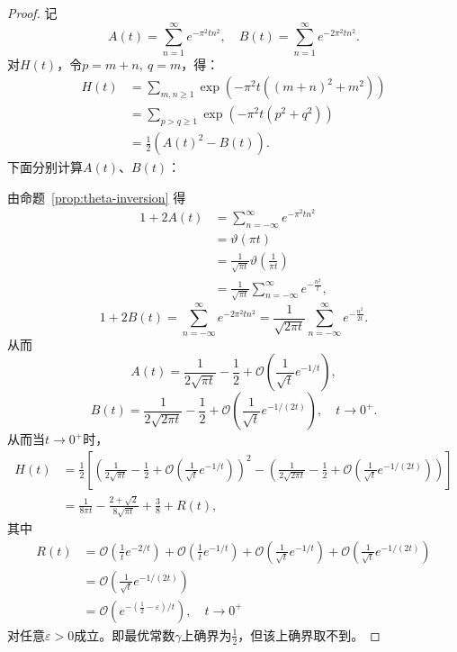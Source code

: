 \documentclass[UTF8,zihao=5,linespread=1.34]{ctexart}
\theoremstyle{cnplain}
\theoremstyle{cnremark}
\begin{document}
\begin{proof}
记
\[
A(t) = \sum_{n=1}^{\infty} e^{-\pi^{2} t n^{2}},\quad B(t) = \sum_{n=1}^{\infty} e^{-2\pi^{2} t n^{2}}.
\]
对$H(t)$，令$p = m + n,\ q = m$，得：
\begin{align*}
H(t) &= \sum_{m,n \geq 1} \exp\left(-\pi^{2} t ((m+n)^{2} + m^{2})\right) \\
&= \sum_{p > q \geq 1} \exp\left(-\pi^{2} t (p^{2} + q^{2})\right) \\
&= \frac{1}{2}(A(t)^{2} - B(t)).
\end{align*}
下面分别计算$A(t)$、$B(t)$：

由命题~\ref{prop:theta-inversion} 得
\begin{align*}
1 + 2A(t)
&= \sum_{n=-\infty}^{\infty} e^{-\pi^{2} t n^{2}} \\
&= \vartheta(\pi t) \\
&= \frac{1}{\sqrt{\pi t}} \vartheta\left(\frac{1}{\pi t}\right) \\
&= \frac{1}{\sqrt{\pi t}} \sum_{n=-\infty}^{\infty} e^{-\frac{n^{2}}{t}},
\end{align*}
\[
1 + 2B(t) = \sum_{n=-\infty}^{\infty} e^{-2\pi^{2} t n^{2}}
= \frac{1}{\sqrt{2\pi t}} \sum_{n=-\infty}^{\infty} e^{-\frac{n^{2}}{2t}}.
\]
从而
\[
A(t) = \frac{1}{2\sqrt{\pi t}} - \frac{1}{2} + \mathcal{O}\left(\frac{1}{\sqrt{t}} e^{-1/t}\right),
\]
\[
B(t) = \frac{1}{2\sqrt{2\pi t}} - \frac{1}{2} + \mathcal{O}\left(\frac{1}{\sqrt{t}} e^{-1/(2t)}\right),\quad t \rightarrow 0^{+}.
\]
从而当$t \rightarrow 0^{+}$时，
\begin{align*}
H(t) &= \frac{1}{2}\left[\left(\frac{1}{2\sqrt{\pi t}} - \frac{1}{2} + \mathcal{O}\left(\frac{1}{\sqrt{t}} e^{-1/t}\right)\right)^{2}
      - \left(\frac{1}{2\sqrt{2\pi t}} - \frac{1}{2} + \mathcal{O}\left(\frac{1}{\sqrt{t}} e^{-1/(2t)}\right)\right)\right] \\
&= \frac{1}{8\pi t} - \frac{2 + \sqrt{2}}{8\sqrt{\pi t}} + \frac{3}{8} + R(t),
\end{align*}
其中
\begin{align*}
R(t) &= \mathcal{O}\left(\frac{1}{t} e^{-2/t}\right)
      + \mathcal{O}\left(\frac{1}{t} e^{-1/t}\right)
      + \mathcal{O}\left(\frac{1}{\sqrt{t}} e^{-1/t}\right)
      + \mathcal{O}\left(\frac{1}{\sqrt{t}} e^{-1/(2t)}\right) \\
&= \mathcal{O}\left(\frac{1}{\sqrt{t}} e^{-1/(2t)}\right)
\\
&= \mathcal{O}\left(e^{-(\frac{1}{2} - \varepsilon)/t}\right),\quad t \rightarrow 0^{+}
\end{align*}
对任意$\varepsilon > 0$成立。即最优常数$\gamma$上确界为$\frac{1}{2}$，但该上确界取不到。
\end{proof}
\end{document}
